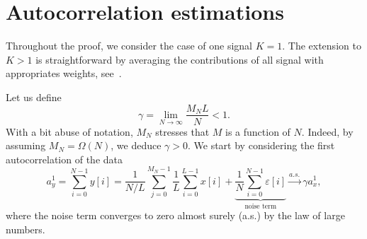 \documentclass[english,11pt]{article}
\newcommand{\TODO}[1]{{\color{red}{[#1]}}}
\numberwithin{equation}{section}
\theoremstyle{plain}
\theoremstyle{definition}
\theoremstyle{remark}
\theoremstyle{plain}
\theoremstyle{remark}
\theoremstyle{plain}
\theoremstyle{plain}
\begin{document}
%
%








\appendix

\section{Autocorrelation estimations} \label{sec:autocorrelation_computation}

Throughout the proof, we consider the case of one signal $K=1$. The extension to $K>1$ is straightforward by averaging the contributions of all signal with  appropriates weights, see~\cite{boumal2017heterogeneous}. 

Let us define
\begin{equation}
\gamma = \lim_{N\to\infty} \frac{M_NL}{N}<1.
\end{equation}
With a bit abuse of notation, $M_N$ stresses that $M$ is a function of $N$. Indeed, by assuming $M_N=\Omega(N)$, we deduce $\gamma>0$.
We start by considering the first autocorrelation of the data
\begin{equation}
a_y^1 = \sum_{i=0}^{N-1} y[i] = \frac{1}{N/L}\sum_{j=0}^{M_N-1}\frac{1}{L}\sum_{i=0}^{L-1}x[i] + \underbrace{\frac{1}{N}\sum_{i=0}^{N-1}\varepsilon[i]}_{\text{noise term}} \xrightarrow{a.s.}\gamma a_x^1,
\end{equation}
where the noise term converges to zero almost surely (a.s.) by the law of large numbers.
\end{document}
